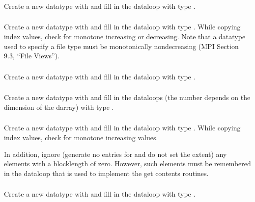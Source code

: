 \documentclass{article}
\begin{document}
\subsubsection{}
Create a new datatype with  and fill in the dataloop
with type .  

\subsubsection{}
Create a new datatype with  and fill in the dataloop
with type .
While copying index values, check for monotone increasing or
decreasing.  Note that a datatype used to specify a file type must be
monotonically nondecreasing (MPI Section 9.3, ``File Views'').

\subsubsection{}
Create a new datatype with  and fill in the dataloop
with type .

\subsubsection{}
Create a new datatype with  and fill in the
dataloops (the number depends on the dimension of the darray) 
with type .

\subsubsection{}
Create a new datatype with  and fill in the dataloop
with type .  While copying index values, check
for monotone increasing values.

In addition, ignore (generate no entries for and do not set the extent) any
elements with a blocklength of zero.  However, such elements must be
remembered in the dataloop that is used to implement the get contents routines.

\subsubsection{}
Create a new datatype with  and fill in the dataloop
with type .
\end{document}
